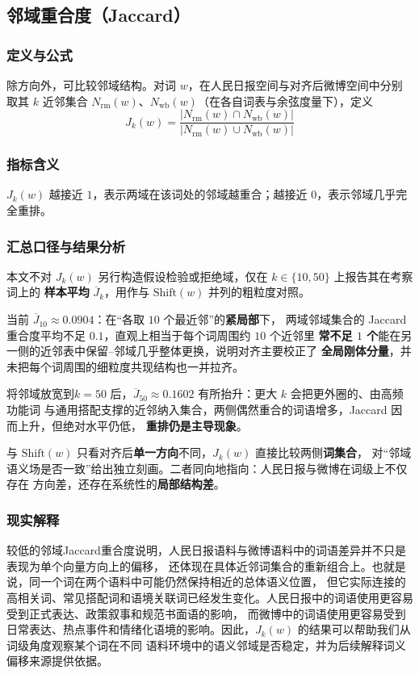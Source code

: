 \documentclass[withoutpreface]{cumcmthesis}
\begin{document}
\subsection{邻域重合度（Jaccard）}

\subsubsection{定义与公式}
除方向外，可比较邻域结构。对词 $w$，在人民日报空间与对齐后微博空间中分别取其 $k$ 近邻集合
 $N_{\mathrm{rm}}(w)$、$N_{\mathrm{wb}}(w)$（在各自词表与余弦度量下），定义
\begin{equation}
  J_k(w)
  = \frac{\lvert N_{\mathrm{rm}}(w)\cap N_{\mathrm{wb}}(w)\rvert}{\lvert N_{\mathrm{rm}}(w)\cup N_{\mathrm{wb}}(w)\rvert}
\end{equation}

\subsubsection{指标含义}
$J_k(w)$ 越接近 $1$，表示两域在该词处的邻域越重合；越接近 $0$，表示邻域几乎完全重排。

\subsubsection{汇总口径与结果分析}
本文不对 $J_k(w)$ 另行构造假设检验或拒绝域，仅在 $k\in\{10,50\}$ 上报告其在考察词上的
\textbf{样本平均} $\overline{J}_k$，用作与 $\mathrm{Shift}(w)$ 并列的粗粒度对照。

当前 $\overline{J}_{10}\approx0.0904$：在“各取 $10$ 个最近邻”的\textbf{紧局部}下，
两域邻域集合的 Jaccard 重合度平均不足 $0.1$，直观上相当于每个词周围约 $10$ 个近邻里
\textbf{常不足 $1$ 个}能在另一侧的近邻表中保留--邻域几乎整体更换，说明对齐主要校正了
\textbf{全局刚体分量}，并未把每个词周围的细粒度共现结构也一并拉齐。

将邻域放宽到$k=50$ 后，$\overline{J}_{50}\approx0.1602$ 有所抬升：更大 $k$ 会把更外圈的、由高频功能词
与通用搭配支撑的近邻纳入集合，两侧偶然重合的词语增多，Jaccard 因而上升，但绝对水平仍低，
\textbf{重排仍是主导现象}。

与 $\mathrm{Shift}(w)$ 只看对齐后\textbf{单一方向}不同，$J_k(w)$ 直接比较两侧\textbf{词集合}，
对“邻域语义场是否一致”给出独立刻画。二者同向地指向：人民日报与微博在词级上不仅存在
方向差，还存在系统性的\textbf{局部结构差}。

\subsubsection{现实解释}
较低的邻域Jaccard重合度说明，人民日报语料与微博语料中的词语差异并不只是表现为单个向量方向上的偏移，
还体现在具体近邻词集合的重新组合上。也就是说，同一个词在两个语料中可能仍然保持相近的总体语义位置，
但它实际连接的高相关词、常见搭配词和语境关联词已经发生变化。人民日报中的词语使用更容易受到正式表达、政策叙事和规范书面语的影响，
而微博中的词语使用更容易受到日常表达、热点事件和情绪化语境的影响。因此，$J_k(w)$ 的结果可以帮助我们从词级角度观察某个词在不同
语料环境中的语义邻域是否稳定，并为后续解释词义偏移来源提供依据。
\end{document}
